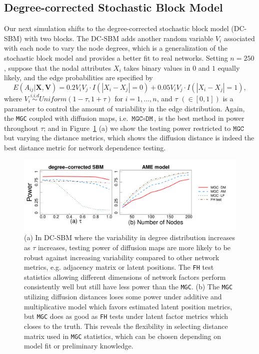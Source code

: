 \documentclass[11pt]{article}
\theoremstyle{definition}
\begin{document}
\subsection{Degree-corrected Stochastic Block Model}
Our next simulation shifts to the degree-corrected stochastic block model (DC-SBM) with two blocks. The DC-SBM adds another random variable $V_{i}$ associated with each node to vary the node degrees, which is a generalization of the stochastic block model and provides a better fit to real networks. Setting $n=250$, suppose that the nodal attributes $X_i$ takes binary values in $0$ and $1$ equally likely, and the edge probabilities are specified by  
\vspace*{-0.4cm}
\begin{equation}
E( A_{ij} | \mathbf{X}, \mathbf{V} )  = 0.2 V_{i} V_{j} \cdot I ( |X_{i} - X_{j}| = 0 ) + 0.05 V_{i} V_{j} \cdot I(|X_{i} - X_{j}| = 1),
\label{eq:tau}
\end{equation} 
where $V_{i} \overset{i.i.d}{\sim} Uniform(1 - \tau, 1 + \tau)$ for $i = 1, \ldots, n$, and $\tau$ $(\in [0, 1])$ is a parameter to control the amount of variability in the edge distribution. Again, the \texttt{MGC} coupled with diffusion maps, i.e. $\texttt{MGC} \circ \texttt{DM}$, is the best method in power throughout $\tau$; and in Figure~\ref{fig:combined} (a) we show the testing power restricted to $\texttt{MGC}$ but varying the distance metrics, which shows the diffusion distance is indeed the best distance metric for network dependence testing.

\begin{figure}[ht]
	\centering
	\includegraphics[width=\textwidth]{amedc.pdf}
	\caption{(a) In DC-SBM where the variability in degree distribution increases as $\tau$ increases, testing power of diffusion maps are more likely to be robust against increasing variability compared to other network metrics, e.g. adjacency matrix or latent positions. The \texttt{FH} test statistics allowing different dimensions of network factors perform consistently well but still have less power than the \texttt{MGC}. (b) The \texttt{MGC} utilizing diffusion distances loses some power under additive and multiplicative model which favors estimated latent position metrics, but \texttt{MGC} does as good as \texttt{FH} tests under latent factor metrics which closes to the truth. This reveals the flexibility in selecting distance matrix used in \texttt{MGC} statistics, which can be chosen depending on model fit or preliminary knowledge.}
	\label{fig:combined}
\end{figure}	
\end{document}
